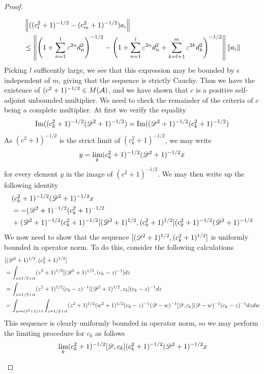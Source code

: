 \begin{proof}
\begin{itemize}
\begin{align*}
			&\left \Vert ((c_l^2+1)^{-1/2}-(c_m^2+1)^{-1/2})a_i \right \Vert \\
			&\leq \left \Vert \left ( 1+\sum_{n=1}^l \varepsilon^{2n}d^2_n \right )^{-1/2}-\left ( 1+\sum_{n=1}^l \varepsilon^{2n}d^2_n+\sum_{k=l+1}^m\varepsilon^{2k}d^2_k \right )^{-1/2} \right \Vert\left \Vert a_i \right \Vert
		\end{align*}
		Picking $l$ sufficently large, we see that this expression may be bounded by $\epsilon$ independent of $m$, giving that the sequence is strictly Cauchy. Thus we have the existence of $(c^2+1)^{-1/2}\in M(\mathcal{A})$, and we have shown that $c$ is a positive self-adjoint unbounded multiplier. We need to check the remainder of the criteria of $c$ being a complete multiplier. At first we verify the equality 
		\begin{align*}
			\operatorname{Im}((c_k^2+1)^{-1/2}(\mathscr{D}^2+1)^{-1/2})=\operatorname{Im}((\mathscr{D}^2+1)^{-1/2}(c_k^2+1)^{-1/2})
		\end{align*}
		As $(c^2+1)^{-1/2}$ is the strict limit of $(c_k^2+1)^{-1/2}$, we may write 
		\begin{align*}
			y=\lim_k(c_k^2+1)^{-1/2}(\mathscr{D}^2+1)^{-1/2}x
		\end{align*}
		for every element $y$ in the image  of $(c^2+1)^{-1/2}$.
		We may then write up the following identity
		\begin{align*}
			&(c_k^2+1)^{-1/2}(\mathscr{D}^2+1)^{-1/2}x \\
			&=-(\mathscr{D}^2+1)^{-1/2}(c_k^2+1)^{-1/2} \\
			&+(\mathscr{D}^2+1)^{-1/2}(c_k^2+1)^{-1/2}[(\mathscr{D}^2+1)^{1/2},(c_k^2+1)^{1/2}](c_k^2+1)^{-1/2}(\mathscr{D}^2+1)^{-1/2}
		\end{align*}
		We now need to show that the sequence $[(\mathscr{D}^2+1)^{1/2},(c_k^2+1)^{1/2}]$ is uniformly bounded in operator norm. To do this, consider the following calculations
		\begin{align*}
			&[(\mathscr{D}^2+1)^{1/2},(c_k^2+1)^{1/2}] \\
			&=\int_{z=1/2+it}(z^2+1)^{1/2}[(\mathscr{D}^2+1)^{1/2},(c_k-z)^{-1}] dz\\
			&=\int_{z=1/2+it}(z^2+1)^{1/2}(c_k-z)^{-1}[(\mathscr{D}^2+1)^{1/2},c_k](c_k-z)^{-1} dz \\
			&=\int_{w=i(t^2+1)+t}\int_{z=1/2+it}(z^2+1)^{1/2}(w^2+1)^{1/2}(c_k-z)^{-1}(\mathscr{D}-w)^{-1}[\mathscr{D},c_k](\mathscr{D}-w)^{-1}(c_k-z)^{-1} dzdw 
		\end{align*}
		This sequence is clearly uniformly bounded in operator norm, so we may perform the limiting procedure for $c_k$ as follows
		\begin{align*}
			&\lim_k(c_k^2+1)^{-1/2}[\D,c_k](c_k^2+1)^{-1/2}(\D^2+1)^{-1/2}x \\

\end{align*}
\end{itemize}
\end{proof}
